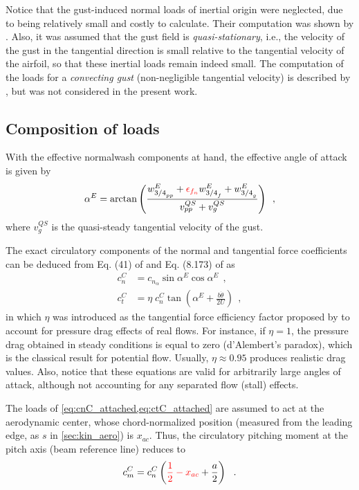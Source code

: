 \documentclass[12pt,a4paper,oneside,english]{abntex2} %
\newcommand{\fix}[1]{{\color{red}#1}}
\def\lp{\left(}
\def\rp{\right)}
\def\thetadot{\dot{\theta}}
\begin{document}
Notice that the gust-induced normal loads of inertial origin were neglected, due to being relatively small and costly to calculate. Their computation was shown by . Also, it was assumed that the gust field is \textit{quasi-stationary}, i.e., the velocity of the gust in the tangential direction is small relative to the tangential velocity of the airfoil, so that these inertial loads remain indeed small. The computation of the loads for a \textit{convecting gust} (non-negligible tangential velocity) is described by , but was not considered in the present work.

\subsection{Composition of loads}
\label{subsec:loads_composition}

With the effective normalwash components at hand, the effective angle of attack is given by
\begin{equation}
    \alpha^E = \arctan{\lp\frac{w_{{3/4}_{pp}}^{E}+\fix{\epsilon_{f_n}}w_{{3/4}_f}^{E}+w_{{3/4}_g}^{E}}{v_{pp}^{QS}+v_g^{QS}}\rp}
    \ \ ,
    \label{eq:alpha_E}
\end{equation}
where $v_g^{QS}$ is the quasi-steady tangential velocity of the gust.

The exact circulatory components of the normal and tangential force coefficients can be deduced from Eq. (41) of   and Eq. (8.173) of  as
\begin{align}
    c_n^C &= c_{n_{\alpha}}\sin\alpha^E\cos\alpha^E
    \ \ , \label{eq:cnC_attached}
    \\
    c_t^C &= \eta \;c_n^C \tan\lp\alpha^E+\frac{b\thetadot}{2U}\rp \ \ ,
    \label{eq:ctC_attached}
\end{align}
in which $\eta$ was introduced as the tangential force efficiency factor proposed by  to account for pressure drag effects of real flows. For instance, if $\eta=1$, the pressure drag obtained in steady conditions is equal to zero (\fix{d'Alembert's} paradox), which is the classical result for potential flow. Usually, $\eta\approx0.95$ produces realistic drag values. Also, notice that these equations are valid for arbitrarily large angles of attack, although not accounting for any separated flow (stall) effects.

The loads of \cref{eq:cnC_attached,eq:ctC_attached} are assumed to act at the aerodynamic center, whose chord-normalized position \fix{(measured from the leading edge, as $s$ in \cref{sec:kin_aero})} is $x_{ac}$. Thus, the circulatory pitching moment at the pitch axis (beam reference line) \fix{reduces} to
\begin{equation}
    c_m^C = c_n^C\lp \fix{\frac{1}{2}-x_{ac}}+\frac{a}{2}\rp \ \ .
    \label{eq:cmC_attached}
\end{equation}
\end{document}
